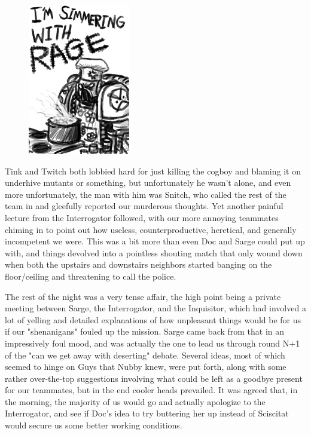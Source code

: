 \begin{figure}
	\begin{center}
		\includegraphics[width=\figwidth]{pics/17/34.png}
	\end{center}
\end{figure}
Tink and Twitch both lobbied hard for just killing the cogboy and blaming it on underhive mutants or something, but unfortunately he wasn't alone, and even more unfortunately, the man with him was Snitch, who called the rest of the team in and gleefully reported our murderous thoughts. 
Yet another painful lecture from the Interrogator followed, with our more annoying teammates chiming in to point out how useless, counterproductive, heretical, and generally incompetent we were. 
This was a bit more than even Doc and Sarge could put up with, and things devolved into a pointless shouting match that only wound down when both the upstairs and downstairs neighbors started banging on the floor/ceiling and threatening to call the police.

The rest of the night was a very tense affair, the high point being a private meeting between Sarge, the Interrogator, and the Inquisitor, which had involved a lot of yelling and detailed explanations of how unpleasant things would be for us if our "shenanigans" fouled up the mission. 
Sarge came back from that in an impressively foul mood, and was actually the one to lead us through round N+1 of the "can we get away with deserting" debate. 
Several ideas, most of which seemed to hinge on Guys that Nubby knew, were put forth, along with some rather over-the-top suggestions involving what could be left as a goodbye present for our teammates, but in the end cooler heads prevailed. 
It was agreed that, in the morning, the majority of us would go and actually apologize to the Interrogator, and see if Doc's idea to try buttering her up instead of Sciscitat would secure us some better working conditions.

